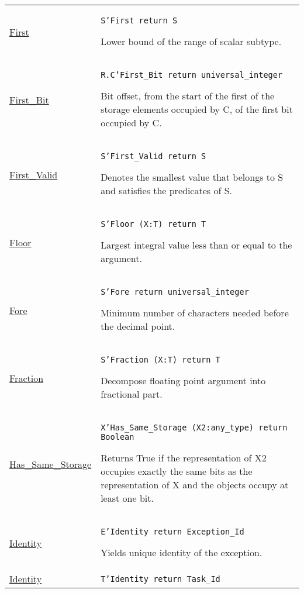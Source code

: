 \documentclass[english]{article}
\begin{document}
\begin{scriptsize}
\begin{multicols*}{3}
\begin{tabular}{@{}p{2cm}p{6.5cm}}
   \href{http://www.ada-auth.org/standards/22rm/html/RM-K-2.html}{First} & \texttt{S'First return S}

   Lower bound of the range of scalar subtype.\\

   \href{http://www.ada-auth.org/standards/22rm/html/RM-K-2.html}{First\_Bit} & \texttt{R.C'First\_Bit return universal\_integer}

   Bit offset, from the start of the first of the storage elements occupied by C, of the first bit occupied by C.\\

   \href{http://www.ada-auth.org/standards/22rm/html/RM-K-2.html}{First\_Valid} & \texttt{S'First\_Valid return S}

   Denotes the smallest value that belongs to S and satisfies the predicates of S.\\

   \href{http://www.ada-auth.org/standards/22rm/html/RM-K-2.html}{Floor} & \texttt{S'Floor (X:T) return T}

   Largest integral value less than or equal to the argument.\\

   \href{http://www.ada-auth.org/standards/22rm/html/RM-K-2.html}{Fore} & \texttt{S'Fore return universal\_integer}

   Minimum number of characters needed before the decimal point.\\

   \href{http://www.ada-auth.org/standards/22rm/html/RM-K-2.html}{Fraction} & \texttt{S'Fraction (X:T) return T}

   Decompose floating point argument into fractional part.\\

   \href{http://www.ada-auth.org/standards/22rm/html/RM-K-2.html}{Has\_Same\_Storage} & \texttt{X'Has\_Same\_Storage  (X2:any\_type) return Boolean}

   Returns True if the representation of X2 occupies exactly the same bits as the representation of X and the objects occupy at least one bit.\\

   \href{http://www.ada-auth.org/standards/22rm/html/RM-K-2.html}{Identity} & \texttt{E'Identity return Exception\_Id}

   Yields unique identity of the exception.\\

   \href{http://www.ada-auth.org/standards/22rm/html/RM-K-2.html}{Identity} & \texttt{T'Identity return Task\_Id}


\end{tabular}
\end{multicols*}
\end{scriptsize}
\end{document}

